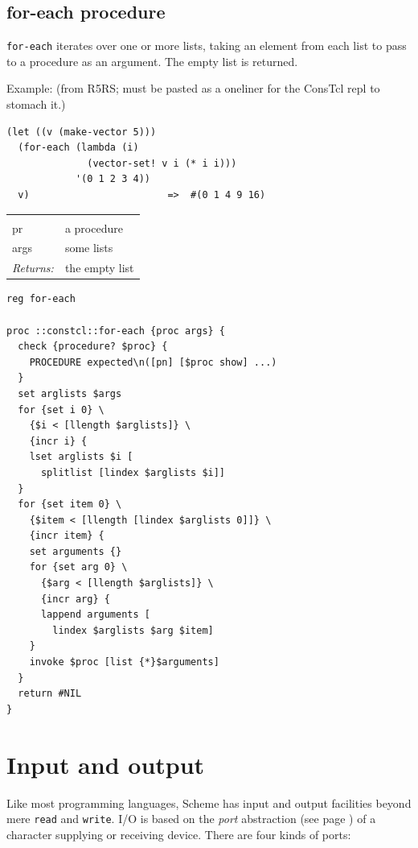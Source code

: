\documentclass[twoside]{report}
\begin{document}
\subsection{for-each procedure}
\label{foreach-procedure}

\texttt{for-each} iterates over one or more lists, taking an element from each list to pass to a procedure as an argument. The empty list is returned.

Example: (from R5RS; must be pasted as a oneliner for the ConsTcl repl to stomach it.)

\begin{verbatim}
(let ((v (make-vector 5)))
  (for-each (lambda (i)
              (vector-set! v i (* i i)))
            '(0 1 2 3 4))
  v)                        =>  #(0 1 4 9 16)
\end{verbatim}

\noindent\begin{tabular}{ |p{1.9cm} p{8cm}| }
\hline
\rowcolor[HTML]{CCCCCC} \multicolumn{2}{|l|}{\bf for-each (public)} \\
pr & a procedure \\
args & some lists \\
\textit{Returns:} & the empty list \\
\hline
\end{tabular}

\begin{lstlisting}
reg for-each

proc ::constcl::for-each {proc args} {
  check {procedure? $proc} {
    PROCEDURE expected\n([pn] [$proc show] ...)
  }
  set arglists $args
  for {set i 0} \
    {$i < [llength $arglists]} \
    {incr i} {
    lset arglists $i [
      splitlist [lindex $arglists $i]]
  }
  for {set item 0} \
    {$item < [llength [lindex $arglists 0]]} \
    {incr item} {
    set arguments {}
    for {set arg 0} \
      {$arg < [llength $arglists]} \
      {incr arg} {
      lappend arguments [
        lindex $arglists $arg $item]
    }
    invoke $proc [list {*}$arguments]
  }
  return #NIL
}
\end{lstlisting}

\section{Input and output}
\label{input-and-output}

Like most programming languages, Scheme has input and output facilities beyond mere \texttt{read} and \texttt{write}. I/O is based on the \emph{port} abstraction (see page \pageref{ports}) of a character supplying or receiving device. There are four kinds of ports:
\end{document}
